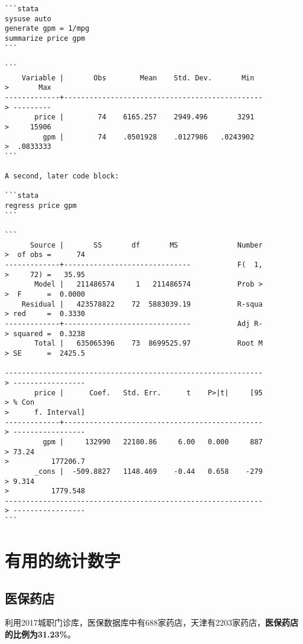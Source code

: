 \documentclass[
]{book}
\begin{document}
\begin{verbatim}
```stata
sysuse auto
generate gpm = 1/mpg
summarize price gpm
```

```
    Variable |       Obs        Mean    Std. Dev.       Min  
>       Max
-------------+-----------------------------------------------
> ---------
       price |        74    6165.257    2949.496       3291  
>     15906
         gpm |        74    .0501928    .0127986   .0243902  
>  .0833333
```

A second, later code block:

```stata
regress price gpm
```

```
      Source |       SS       df       MS              Number
>  of obs =      74
-------------+------------------------------           F(  1,
>     72) =   35.95
       Model |   211486574     1   211486574           Prob >
>  F      =  0.0000
    Residual |   423578822    72  5883039.19           R-squa
> red     =  0.3330
-------------+------------------------------           Adj R-
> squared =  0.3238
       Total |   635065396    73  8699525.97           Root M
> SE      =  2425.5

-------------------------------------------------------------
> -----------------
       price |      Coef.   Std. Err.      t    P>|t|     [95
> % Con                                                      
>      f. Interval]
-------------+-----------------------------------------------
> -----------------
         gpm |     132990   22180.86     6.00   0.000     887
> 73.24                                                      
>          177206.7
       _cons |  -509.8827   1148.469    -0.44   0.658    -279
> 9.314                                                      
>          1779.548
-------------------------------------------------------------
> -----------------
```
\end{verbatim}

\hypertarget{useful}{%
\chapter{有用的统计数字}\label{useful}}

\hypertarget{num_of_pharmacy}{%
\section{医保药店}\label{num_of_pharmacy}}

利用2017城职门诊库，医保数据库中有688家药店，天津有2203家药店，\textbf{医保药店的比例为31.23\%}。
\end{document}
